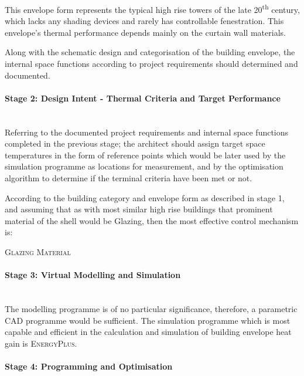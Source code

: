 This envelope form represents the typical high rise towers of the late 20\textsuperscript{th} century, which lacks any shading devices and rarely has controllable fenestration. This envelope's thermal performance depends mainly on the curtain wall materials.

Along with the schematic design and categorisation of the building envelope, the internal space functions according to project requirements should determined and documented.

\paragraph{Stage 2: Design Intent - Thermal Criteria and Target Performance}\mbox{}\\

Referring to the documented project requirements and internal space functions completed in the previous stage; the architect should assign target space temperatures in the form of reference points which would be later used by the simulation programme as locations for measurement, and by the optimisation algorithm to determine if the terminal criteria have been met or not.

According to the building category and envelope form as described in stage 1, and assuming that as with most similar high rise buildings that prominent material of the shell would be Glazing, then the most effective control mechanism is: 

\begin{compactenum}
	\item \textsc{Glazing Material}
\end{compactenum}

\paragraph{Stage 3: Virtual Modelling and Simulation}\mbox{}\\

The modelling programme is of no particular significance, therefore, a parametric CAD programme would be sufficient. The simulation programme which is most capable and efficient in the calculation and simulation of building envelope heat gain is \textsc{EnergyPlus}.

\paragraph{Stage 4: Programming and Optimisation}\mbox{}\\


